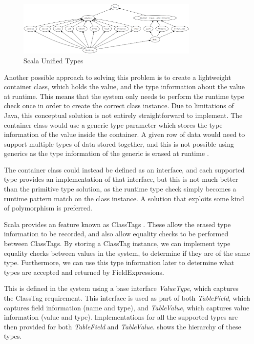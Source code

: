 \begin{figure}[h]
	\centering
	\includegraphics[width=0.8\textwidth]{chapters/diagrams/implementation/unified-types-diagram}
	\caption{Scala Unified Types \protect\cite{scala_unified_types}}
	\label{fig:scala-unified-types}
\end{figure}

Another possible approach to solving this problem is to create a lightweight container class, which holds the value, and the type information about the value at runtime. This means that the system only needs to perform the runtime type check once in order to create the correct class instance. Due to limitations of Java, this conceptual solution is not entirely straightforward to implement. The container class would use a generic type parameter which stores the type information of the value inside the container. A given row of data would need to support multiple types of data stored together, and this is not possible using generics as the type information of the generic is erased at runtime . 

The container class could instead be defined as an interface, and each supported type provides an implementation of that interface, but this is not much better than the primitive type solution, as the runtime type check simply becomes a runtime pattern match on the class instance. A solution that exploits some kind of polymorphism is preferred.

Scala provides an feature known as ClassTags . These allow the erased type information to be recorded, and also allow equality checks to be performed between ClassTags. By storing a ClassTag instance, we can implement type equality checks between values in the system, to determine if they are of the same type. Furthermore, we can use this type information later to determine what types are accepted and returned by FieldExpressions.

This is defined in the system using a base interface \textit{ValueType}, which captures the ClassTag requirement. This interface is used as part of both \textit{TableField}, which captures field information (name and type), and \textit{TableValue}, which captures value information (value and type). Implementations for all the supported types are then provided for both \textit{TableField} and \textit{TableValue}.  shows the hierarchy of these types. 

